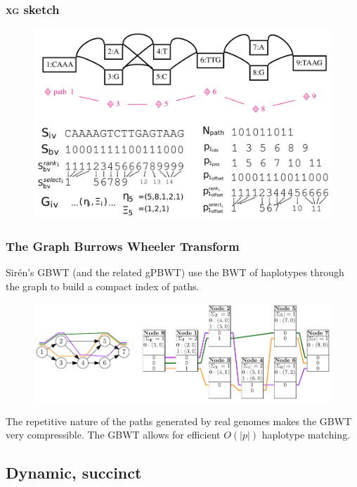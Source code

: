 \documentclass{beamer}
\begin{document}
\begin{frame}
  \frametitle{\textsc{xg} sketch}
  \begin{figure}
    \includegraphics[scale=0.375,center]{xg_index_sketch_nice.pdf}
  \end{figure}
\end{frame}

\begin{frame}
  \frametitle{The Graph Burrows Wheeler Transform}
  Sirén's GBWT (and the related gPBWT) use the BWT of haplotypes through the graph to build a compact index of paths.

  \begin{figure}
    \includegraphics[scale=0.75,center]{gbwt-example.pdf}
  \end{figure}

  The repetitive nature of the paths generated by real genomes makes the GBWT very compressible.
  The GBWT allows for efficient $O(|p|)$ haplotype matching.
\end{frame}

\subsection{Dynamic, succinct}
\end{document}
